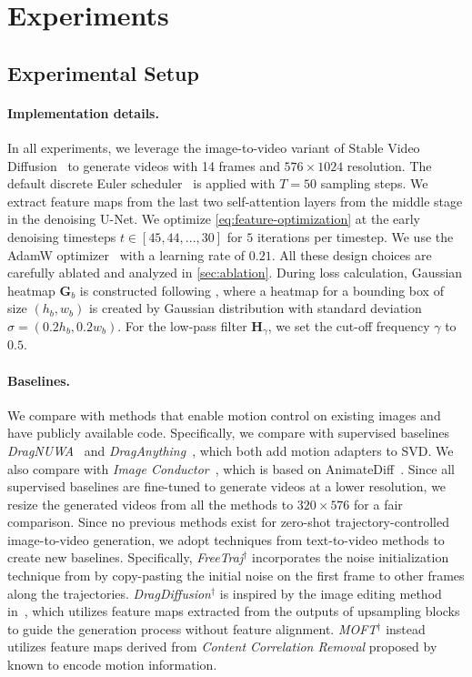 \vspace{-3.0mm}
\section{Experiments}
\label{sec:experiments}

\subsection{Experimental Setup}
\label{sec:exp_setup}
\paragraph{Implementation details.}
In all experiments, we leverage the image-to-video variant of Stable Video Diffusion~\citep{blattmann2023stable} to generate videos with 14 frames and $576 \times 1024$ resolution. 
The default discrete Euler scheduler~\citep{karras2022elucidating} is applied with $T=50$ sampling steps.
We extract feature maps from the last two self-attention layers from the middle stage in the denoising U-Net. %
We optimize \cref{eq:feature-optimization} at the early denoising timesteps $t \in [45, 44, ..., 30]$ for $5$ iterations per timestep.
We use the AdamW optimizer~\citep{adamw} with a learning rate of $0.21$.
All these design choices are carefully ablated and analyzed in \cref{sec:ablation}.
During loss calculation, Gaussian heatmap $\bm{G}_{b}$ is constructed following \citep{wu2024draganything}, where a heatmap for a bounding box of size $(h_b, w_b)$ is created by Gaussian distribution with standard deviation $\sigma = (0.2h_b, 0.2w_b)$.
For the low-pass filter $\mathbf{H}_\gamma$, we set the cut-off frequency $\gamma$ to $0.5$. %

\paragraph{Baselines.}
We compare with methods that enable motion control on existing images and have publicly available code.
Specifically, we compare with supervised baselines \textit{DragNUWA}~\citep{yin2023dragnuwa} and \textit{DragAnything}~\citep{wu2024draganything}, which both add motion adapters to SVD.
We also compare with \textit{Image Conductor}~\citep{li2024image}, which is based on AnimateDiff~\citep{AnimateDiff}.
Since all supervised baselines are fine-tuned to generate videos at a lower resolution, we resize the generated videos from all the methods to $320 \times 576$ for a fair comparison. %
Since no previous methods exist for zero-shot trajectory-controlled image-to-video generation, we adopt techniques from text-to-video methods to create new baselines.
Specifically, \textit{FreeTraj$^\dagger$} incorporates the noise initialization technique from \citep{qiu2024freetraj} by copy-pasting the initial noise on the first frame to other frames along the trajectories.
\textit{DragDiffusion$^\dagger$} is inspired by the image editing method in~\citep{shi2024dragdiffusion}, which utilizes feature maps extracted from the outputs of upsampling blocks to guide the generation process without feature alignment. \textit{MOFT$^\dagger$} instead utilizes feature maps derived from \textit{Content Correlation Removal} proposed by \citet{MOFT} known to encode motion information.

